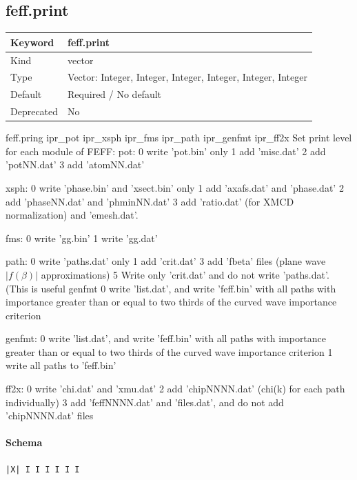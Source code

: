 \documentclass[11pt]{article}
\begin{document}
{{{{\subsection{feff.print}
\label{kw:feff-print}
\begin{longtable}{|p{1.5in}|p{4.5in}|}
\hline
Keyword & feff.print \\
\hline
Kind & vector \\
\hline
Type & Vector: Integer, Integer, Integer, Integer, Integer, Integer \\
\hline
Default & Required / No default \\
\hline
Deprecated & No \\
\hline
\end{longtable}
 feff.pring{ ipr\_pot ipr\_xsph ipr\_fms ipr\_path ipr\_genfmt ipr\_ff2x }
 Set print level for each module of FEFF:
   pot:
     0 write 'pot.bin' only
     1 add 'misc.dat'
     2 add 'potNN.dat'
     3 add 'atomNN.dat'

   xsph:
     0 write 'phase.bin' and 'xsect.bin' only
     1 add 'axafs.dat' and 'phase.dat'
     2 add 'phaseNN.dat' and 'phminNN.dat'
     3 add 'ratio.dat' (for XMCD normalization) and 'emesh.dat'.

   fms:
     0 write 'gg.bin'
     1 write 'gg.dat'

   path:
     0 write 'paths.dat' only
     1 add 'crit.dat'
     3 add 'fbeta' files (plane wave $|f(\beta)|$ approximations)
     5 Write only 'crit.dat' and do not write 'paths.dat'. (This is useful
       genfmt 0 write 'list.dat', and write 'feff.bin' with all paths with
       importance greater than or equal to two thirds of the curved wave
       importance criterion

   genfmt:
     0 write 'list.dat', and write 'feff.bin' with all paths with importance
       greater than or equal to two thirds of the curved wave importance
       criterion
     1 write all paths to 'feff.bin'

   ff2x:
     0 write 'chi.dat' and 'xmu.dat'
     2 add 'chipNNNN.dat' (chi(k) for each path individually)
     3 add 'feffNNNN.dat' and 'files.dat', and do not add 'chipNNNN.dat'
       files

\paragraph{Schema}
\begin{Verbatim}
|X| I I I I I I
\end{Verbatim}

}}}}
\end{document}
